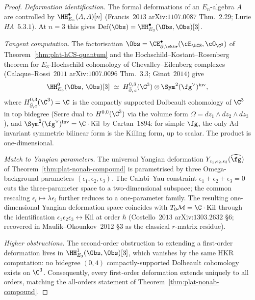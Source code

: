 \begin{proof}
\emph{Deformation identification.}
The formal deformations of an $E_n$-algebra $A$ are controlled by
$\HH^\bullet_{E_n}(A, A)[n]$
(Francis~$2013$ arXiv:$1107.0087$ Thm.~$2.29$; Lurie \emph{HA}~$5.3.1$).
At $n = 3$ this gives
$\mathrm{Def}(\Obs) = \HH^\bullet_{E_3}(\Obs, \Obs)[3]$.

\emph{Tangent computation.}
The factorisation $\Obs = \CE^\bullet_{\bar\partial,\chir}(\cE_{\hCS},
\cO_{\C^3})$ of Theorem~\ref{thm:plat-hCS-quantum} and the
Hochschild--Kostant--Rosenberg theorem for $E_3$-Hochschild cohomology
of Chevalley--Eilenberg complexes
(Calaque--Rossi~$2011$ arXiv:$1007.0096$ Thm.~$3.3$; Ginot~$2014$)
give
\[
 \HH^0_{E_3}(\Obs,\,\Obs)[3]
 \;\simeq\;
 H^{0,3}_{\bar\partial,\,c}(\C^3)
 \otimes \Sym^2(\fg^\vee)^{\mathrm{inv}},
\]
where $H^{0,3}_{\bar\partial, c}(\C^3) = \C$ is the compactly supported
Dolbeault cohomology of $\C^3$ in top bidegree (Serre dual to $H^{0,0}(\C^3)$
via the volume form $\Omega = dz_1 \wedge dz_2 \wedge dz_3$), and
$\Sym^2(\fg^\vee)^{\mathrm{inv}} = \C \cdot \mathrm{Kil}$ by
Cartan~$1894$: for simple $\fg$, the only $\mathrm{Ad}$-invariant
symmetric bilinear form is the Killing form, up to scalar.
The product is one-dimensional.

\emph{Match to Yangian parameters.}
The universal Yangian deformation
$Y_{\epsilon_1, \epsilon_2, \epsilon_3}(\widehat\fg)$ of
Theorem~\ref{thm:plat-nonab-compound} is parametrised by three Omega-background
parameters $(\epsilon_1, \epsilon_2, \epsilon_3)$. The Calabi--Yau
constraint $\epsilon_1 + \epsilon_2 + \epsilon_3 = 0$ cuts the
three-parameter space to a two-dimensional subspace; the common
rescaling $\epsilon_i \mapsto \lambda \epsilon_i$ further reduces to
a one-parameter family. The resulting one-dimensional Yangian
deformation space coincides with $T_0 \mathcal{M} = \C \cdot
\mathrm{Kil}$ through the identification
$\epsilon_1 \epsilon_2 \epsilon_3 \leftrightarrow \mathrm{Kil}$ at
order $\hbar$ (Costello~$2013$ arXiv:$1303.2632$ \S$6$; recovered
in Maulik--Okounkov~$2012$ \S$3$ as the classical $r$-matrix
residue).

\emph{Higher obstructions.}
The second-order obstruction to extending a first-order deformation
lives in $\HH^1_{E_3}(\Obs, \Obs)[3]$, which vanishes by the same
HKR computation: no bidegree $(0,4)$ compactly-supported Dolbeault
cohomology exists on $\C^3$. Consequently, every first-order
deformation extends uniquely to all orders, matching the all-orders
statement of Theorem~\ref{thm:plat-nonab-compound}.
\end{proof}

